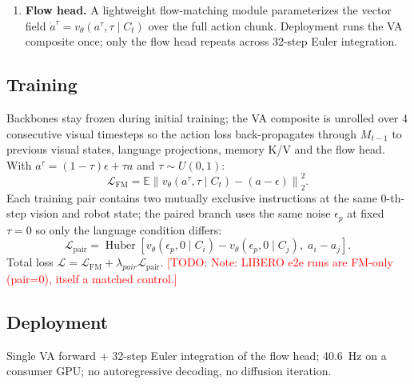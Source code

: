 \documentclass[10pt,twocolumn]{article}
\newcommand{\LFM}{\mathcal{L}_{\mathrm{FM}}}
\newcommand{\Lpair}{\mathcal{L}_{\mathrm{pair}}}
\newcommand{\todo}[1]{\textcolor{red}{[TODO: #1]}}
\begin{document}
\begin{enumerate}
\begin{equation}
[V_t',A_t']=[V_t,A_t]+\operatorname{softmax}\left(\frac{QK^\top}{\sqrt d}\right)U .
\end{equation}
Each layer overwrites memory with $M_t=V_t'$. Vision queries read the
previous target visual memory, the action stream and the fixed language
anchor; action queries read the same. Memory is cleared when the command
changes. After $N$ layers the action stream is normalized into the semantic
action condition $C_t=\operatorname{LN}(A_t^N)$.
\item \textbf{Flow head.} A lightweight flow-matching module parameterizes
the vector field $\dot a^\tau=v_\theta(a^\tau,\tau\mid C_t)$ over the full
action chunk. Deployment runs the VA composite once; only the flow head
repeats across 32-step Euler integration.
\end{enumerate}

\subsection{Training}
\label{sec:training}
Backbones stay frozen during initial training; the VA composite is unrolled
over 4 consecutive visual timesteps so the action loss back-propagates through
$M_{t-1}$ to previous visual states, language projections, memory K/V and the
flow head. With $a^\tau=(1-\tau)\epsilon+\tau a$ and $\tau\sim U(0,1)$:
\begin{equation}
\LFM=\mathbb E\left\|v_\theta(a^\tau,\tau\mid C_t)-(a-\epsilon)\right\|_2^2 .
\end{equation}
Each training pair contains two mutually exclusive instructions at the same
0-th-step vision and robot state; the paired branch uses the same noise
$\epsilon_p$ at fixed $\tau=0$ so only the language condition differs:
\begin{equation}
\Lpair=\operatorname{Huber}\left[
v_\theta(\epsilon_p,0\mid C_i)-v_\theta(\epsilon_p,0\mid C_j),\;
a_i-a_j\right].
\end{equation}
Total loss $\mathcal L=\LFM+\lambda_{pair}\Lpair$.
\todo{Note: LIBERO e2e runs are FM-only (pair=0), itself a matched control.}

\subsection{Deployment}
Single VA forward + 32-step Euler integration of the flow head; 40.6~Hz on a
consumer GPU; no autoregressive decoding, no diffusion iteration.
\end{document}
